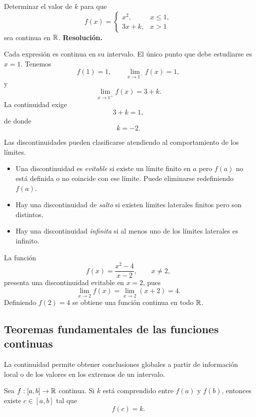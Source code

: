 \begin{solvedexercise}
Determinar el valor de $k$ para que
\[
f(x)=
\begin{cases}
x^2, & x\leq1,\\
3x+k, & x>1
\end{cases}
\]
sea continua en $\mathbb{R}$.
\tcblower
\textbf{Resolución.}\par\smallskip
Cada expresión es continua en su intervalo. El único punto que debe estudiarse es $x=1$. Tenemos
\[
f(1)=1,
\qquad
\lim_{x\to1^-}f(x)=1,
\]
y
\[
\lim_{x\to1^+}f(x)=3+k.
\]
La continuidad exige
\[
3+k=1,
\]
de donde
\[
\boxed{k=-2.}
\]
\end{solvedexercise}

Las discontinuidades pueden clasificarse atendiendo al comportamiento de los límites.

\begin{itemize}
\item Una discontinuidad es \emph{evitable} si existe un límite finito en $a$ pero $f(a)$ no está definida o no coincide con ese límite. Puede eliminarse redefiniendo $f(a)$.
\item Hay una discontinuidad de \emph{salto} si existen límites laterales finitos pero son distintos.
\item Hay una discontinuidad \emph{infinita} si al menos uno de los límites laterales es infinito.
\end{itemize}

\begin{example}
La función
\[
f(x)=\frac{x^2-4}{x-2},\qquad x\neq2,
\]
presenta una discontinuidad evitable en $x=2$, pues
\[
\lim_{x\to2}f(x)=\lim_{x\to2}(x+2)=4.
\]
Definiendo $f(2)=4$ se obtiene una función continua en todo $\mathbb{R}$.
\end{example}

\subsection{Teoremas fundamentales de las funciones continuas}

La continuidad permite obtener conclusiones globales a partir de información local o de los valores en los extremos de un intervalo.

\begin{theorem}
Sea $f:[a,b]\to\mathbb{R}$ continua. Si $k$ está comprendido entre $f(a)$ y $f(b)$, entonces existe $c\in[a,b]$ tal que
\[
f(c)=k.
\]
\end{theorem}

